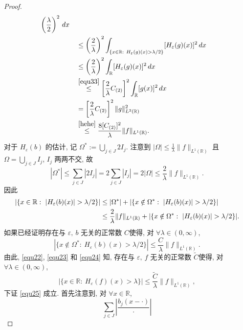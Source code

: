 \documentclass[a4paper,11pt]{article}
\theoremstyle{definition}
\begin{document}
\begin{proof}
\begin{align}
                    \left( \frac{\lambda}{2} \right)^2 \, dx \notag \\
           	&\quad\leq \left( \frac{2}{\lambda} \right)^2
                \int_{\{x\in\mathbb{R} :\ H_\varepsilon (g)(x) > \lambda/2 \}} [H_\varepsilon (g)(x)]^2\,dx \notag \\
           	&\quad\leq \left( \frac{2}{\lambda} \right)^2
                \int_{\mathbb{R}} [H_\varepsilon (g)(x)]^2 \, dx \notag \\
           	&\quad\overset{\eqref{equ33}}{\leq} \left[ \frac{2}{\lambda} C_{(2)} \right]^2  \int_{\mathbb{R}} [g(x)]^2 \, dx \notag \\
           	&\quad= \left[ \frac{2}{\lambda} C_{(2)} \right]^2  \| g \|_{L^2(\mathbb{R})}^2 \notag \\
            &\quad\overset{\eqref{hehe}}{\leq} \frac{8 [C_{(2)}]^2}{\lambda} \| f \|_{L^1(\mathbb{R})}. \notag
    \end{align}
    对于 $ H_\varepsilon (b) $ 的估计, 记 $\Omega^*:=\bigcup_{j \in J}2I_j$.
    注意到 $|\Omega|\leq \frac{1}{\lambda}\|f\|_{L^1(\mathbb{R})}$ 且 $\Omega=\bigcup_{j \in J}I_j$, $I_j$ 两两不交, 故
    $$|\Omega^*|\leq \sum_{j \in J}|2I_j|= 2\sum_{j \in J}|I_j|= 2|\Omega|\leq \frac{2}{\lambda}\|f\|_{L^1(\mathbb{R})}.$$
    因此 
    \begin{align} \label{equ24}
        |\{ x \in \mathbb{R} :\ |H_\varepsilon (b) (x)| > \lambda/2 \}| 
            &\leq |\Omega^*| + |\{ x \notin \Omega^* :\ |H_\varepsilon (b) (x)| > \lambda/2 \}|  \\
            &\leq \frac{2}{\lambda} \|f\|_{L^1(\mathbb{R})} 
                + |\{ x \notin \Omega^* :\ |H_\varepsilon (b) (x)| > \lambda/2 \}|. \notag
    \end{align}
    如果已经证明存在与 $ \varepsilon,\ b $ 无关的正常数 $ C $使得, 对 $ \forall \lambda \in (0, \infty) $,
    \begin{equation} \label{equ25}
        |\{x \notin \Omega^*:\ H_\varepsilon (b)(x) > \lambda / 2 \}|
            \leq \frac{C}{\lambda} \|f\|_{L^1(\mathbb{R})}.
    \end{equation}
    由此, \eqref{equ22}, \eqref{equ23} 和 \eqref{equ24} 知, 
    存在与 $ \varepsilon,\ f $ 无关的正常数 $ \widetilde{C} $使得, 对 $ \forall \lambda \in (0, \infty) $,
    $$
        |\{x \in \mathbb{R}:\ H_\varepsilon (f)(x) > \lambda \}|
            \leq \frac{\widetilde{C}}{\lambda} \|f\|_{L^1(\mathbb{R})},
    $$
    下证 \eqref{equ25} 成立.
    首先注意到, 对 $ \forall x \in \mathbb{R} $,
    $$
        \sum_{j \in J} \left| \frac{b_j(x - \cdot)}{\cdot} \right| 
$$
\end{proof}
\end{document}
